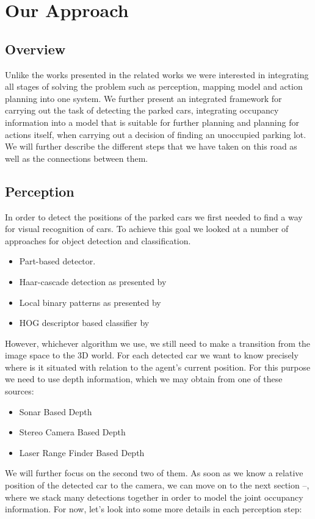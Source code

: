 \chapter{Our Approach}
\label{cha:our_approach}

\section{Overview} %
\label{sec:overview}
Unlike the works presented in the related works we were interested in integrating all stages of solving the problem such as perception, mapping model and action planning into one system. We further present an integrated framework for carrying out the task of detecting the parked cars, integrating occupancy information into a model that is suitable for further planning and planning for actions itself, when carrying out a decision of finding an unoccupied parking lot.
We will further describe the different steps that we have taken on this road as well as the connections between them.

\section{Perception} %
\label{sec:perception}
    In order to detect the positions of the parked cars we first needed to find a way for visual recognition of cars. To achieve this goal we looked at a number of approaches for object detection and classification.
    \begin{itemize}
        \item Part-based detector.
        \item Haar-cascade detection as presented by~\cite{violajones2001}
        \item Local binary patterns as presented by~\cite{lbp2010}
        \item HOG descriptor based classifier by~\cite{dalal2005}
    \end{itemize}
    However, whichever algorithm we use, we still need to make a transition from the image space to the 3D world. For each detected car we want to know precisely where is it situated with relation to the agent's current position.
    For this purpose we need to use depth information, which we may obtain from one of these sources:
    \begin{itemize}
        \item Sonar Based Depth
        \item Stereo Camera Based Depth
        \item Laser Range Finder Based Depth
    \end{itemize}
    We will further focus on the second two of them.
    As soon as we know a relative position of the detected car to the camera, we can move on to the next section --, where we stack many detections together in order to model the joint occupancy information.
    For now, let's look into some more details in each perception step:
